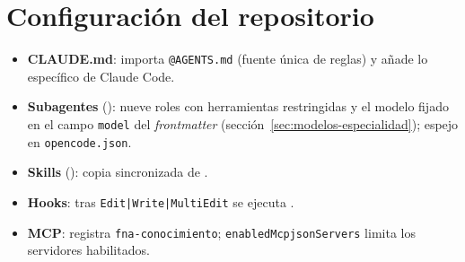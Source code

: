 \section{Configuración del repositorio}
\begin{itemize}
  \item \textbf{CLAUDE.md}: importa \texttt{@AGENTS.md} (fuente única de reglas) y añade lo específico de Claude Code.
  \item \textbf{Subagentes} (): nueve roles con herramientas restringidas y el modelo
        fijado en el campo \texttt{model} del \emph{frontmatter} (sección~\ref{sec:modelos-especialidad}); espejo
        en \texttt{opencode.json}.
  \item \textbf{Skills} (): copia sincronizada de .
  \item \textbf{Hooks}: tras \texttt{Edit|Write|MultiEdit} se ejecuta .
  \item \textbf{MCP}:  registra \texttt{fna-conocimiento}; \texttt{enabledMcpjsonServers} limita
        los servidores habilitados.
\end{itemize}


